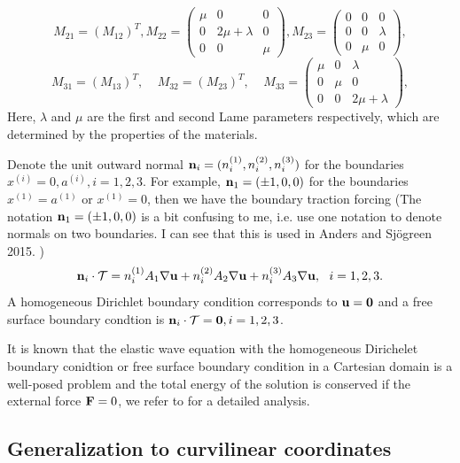 \documentclass[a4paper]{article}
\begin{document}
\[ M_{21} =(M_{12})^T, M_{22} = \left(\begin{array}{ccc}
\mu & 0 & 0\\
0 & 2\mu+\lambda & 0\\
0 & 0 & \mu\end{array}\right), M_{23} = \left(\begin{array}{ccc}
0 & 0 & 0\\
0 & 0 & \lambda\\
0 & \mu & 0\end{array}\right),\]
\[ M_{31} = (M_{13})^T, \ \ \ \ \ M_{32} =(M_{23})^T, \ \ \ \ \ M_{33} = \left(\begin{array}{ccc}
\mu & 0 & \lambda\\
0 & \mu & 0\\
0 & 0 & 2\mu+\lambda\end{array}\right),\]
Here, $\lambda$ and $\mu$ are the first and second Lame parameters respectively, which are determined by the properties of the materials.

Denote the unit outward normal ${\bf n}_i = (n_i^{(1)},n_i^{(2)},n_i^{(3)})$ for the boundaries $x^{(i)} = 0, a^{(i)}, i = 1,2,3$. For example, ${\bf n}_1 = (\pm 1, 0,0)$ for the boundaries $x^{(1)} = a^{(1)}$ or $x^{(1)} = 0$, then we have the boundary traction forcing {\color{red}(The notation ${\bf n}_1 = (\pm 1, 0,0)$ is a bit confusing to me, i.e. use one notation to denote normals on two boundaries. I can see that this is used in Anders and Sjögreen 2015. )}
\begin{equation*}
{\bf n}_i\cdot\mathcal{T} = n^{(1)}_iA_1\nabla{\bf u} + n^{(2)}_iA_2\nabla{\bf u} + n^{(3)}_iA_3\nabla{\bf u},\ \ i = 1,2,3. 
\end{equation*}
A homogeneous Dirichlet boundary condition corresponds to ${\bf u} = {\bf 0}$ and a free surface boundary condtion is ${\bf n}_i\cdot\mathcal{T}  = {\bf 0}, i = 1,2,3$.

It is known that the elastic wave equation with the homogeneous Dirichelet boundary conidtion or free surface boundary condition in a Cartesian domain is a well-posed problem and the total energy of the solution is conserved if the external force ${\bf F} = 0$, we refer to \cite{?} for a detailed analysis.

\subsection{Generalization to curvilinear coordinates}
\end{document}
